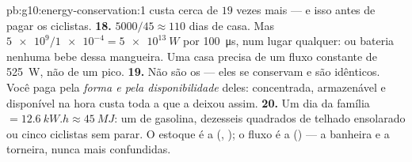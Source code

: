 \begin{solution}{pb:g10:energy-conservation:1}
custa cerca de $19$ vezes mais --- e isso antes de pagar os ciclistas.
\textbf{18.} $5000/45 \approx 110$ dias de casa. Mas
$\num{5e9}/\num{1e-4} = \qty{5e13}{W}$ por \qty{100}{\micro s}, num lugar
qualquer:  ou bateria nenhuma bebe dessa mangueira. Uma casa
precisa de um fluxo constante de \qty{525}{W}, não de um pico.
\textbf{19.} Não são os  --- eles se conservam e são idênticos.
Você paga pela \emph{forma e pela disponibilidade} deles: 
concentrada, armazenável e disponível na hora custa toda a  que a deixou assim.
\textbf{20.} Um dia da família $= \qty{12.6}{kW.h} \approx \qty{45}{MJ}$:
um  de gasolina, dezesseis  quadrados de telhado
ensolarado ou cinco ciclistas sem parar. O estoque é a  (,
); o fluxo é a  () --- a banheira e a
torneira, nunca mais confundidas.
\end{solution}
